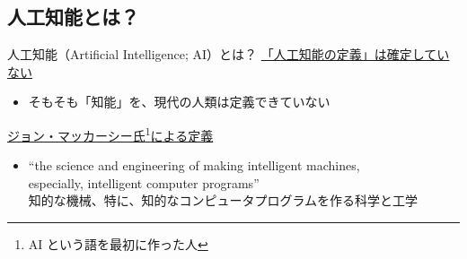 \documentclass[dvipdfmx,aspectratio=169]{beamer}
\begin{document}
	\subsection{人工知能とは？}
	\begin{frame}{人工知能（Artificial Intelligence; AI）とは？}
		\underline{「人工知能の定義」は確定していない}
		\begin{itemize}
			\item そもそも「知能」を、現代の人類は定義できていない
		\end{itemize}
		\underline{ジョン・マッカーシー氏\footnote{AI という語を最初に作った人}による定義}
		\begin{itemize}
			\item
				``the science and engineering of making intelligent machines, \\especially, intelligent computer programs''\\
				知的な機械、特に、知的なコンピュータプログラムを作る科学と工学
		\end{itemize}
	\end{frame}
	
\end{document}
